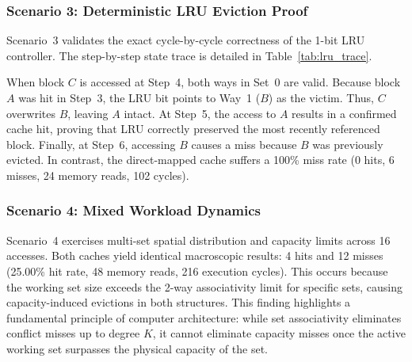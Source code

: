 \documentclass[conference]{IEEEtran}
\begin{document}
\subsubsection{Scenario 3: Deterministic LRU Eviction Proof}
Scenario~3 validates the exact cycle-by-cycle correctness of the 1-bit LRU controller. The step-by-step state trace is detailed in Table~\ref{tab:lru_trace}.

\begin{table}[htbp]
\caption{Cycle-by-Cycle Trace of Scenario 3 ($A \to B \to A \to C \to A \to B$)}
\label{tab:lru_trace}
\centering
{}
\end{table}

When block $C$ is accessed at Step~4, both ways in Set~0 are valid. Because block $A$ was hit in Step~3, the LRU bit points to Way~1 ($B$) as the victim. Thus, $C$ overwrites $B$, leaving $A$ intact. At Step~5, the access to $A$ results in a confirmed cache hit, proving that LRU correctly preserved the most recently referenced block. Finally, at Step~6, accessing $B$ causes a miss because $B$ was previously evicted. In contrast, the direct-mapped cache suffers a 100\% miss rate (0 hits, 6 misses, 24 memory reads, 102 cycles).

\subsubsection{Scenario 4: Mixed Workload Dynamics}
Scenario~4 exercises multi-set spatial distribution and capacity limits across 16 accesses. Both caches yield identical macroscopic results: 4 hits and 12 misses (25.00\% hit rate, 48 memory reads, 216 execution cycles). This occurs because the working set size exceeds the 2-way associativity limit for specific sets, causing capacity-induced evictions in both structures. This finding highlights a fundamental principle of computer architecture: while set associativity eliminates conflict misses up to degree $K$, it cannot eliminate capacity misses once the active working set surpasses the physical capacity of the set.
\end{document}
